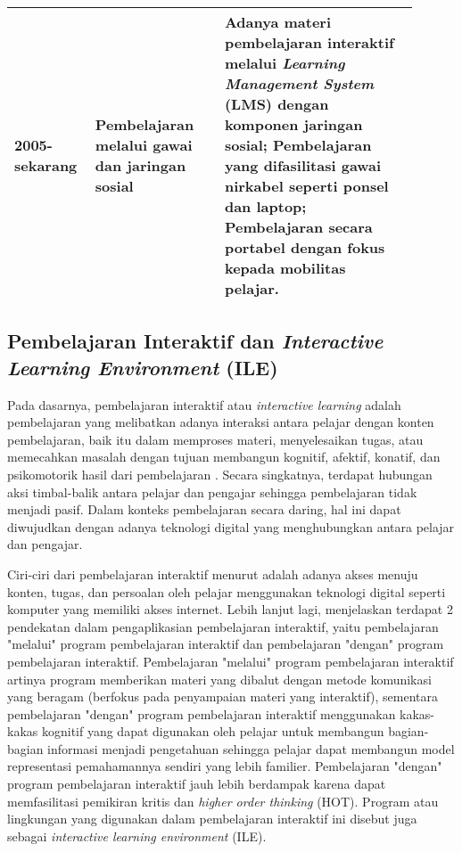 \begin{longtable}{ |p{0.15\linewidth}|p{0.3\linewidth}|p{0.45\linewidth}| }
  \hline
  2005- sekarang & Pembelajaran melalui gawai dan jaringan sosial                       & Adanya materi pembelajaran interaktif melalui \textit{Learning Management System} (LMS) dengan komponen jaringan sosial; Pembelajaran yang difasilitasi gawai nirkabel seperti ponsel dan laptop; Pembelajaran secara portabel dengan fokus kepada mobilitas pelajar. \\
  \hline
\end{longtable}

\subsection{Pembelajaran Interaktif dan \textit{Interactive Learning Environment} (ILE)}

Pada dasarnya, pembelajaran interaktif atau \textit{interactive learning} adalah pembelajaran yang melibatkan adanya interaksi antara pelajar dengan konten pembelajaran, baik itu dalam memproses materi, menyelesaikan tugas, atau memecahkan masalah dengan tujuan membangun kognitif, afektif, konatif, dan psikomotorik hasil dari pembelajaran \parencite{reeves2012interactive}. Secara singkatnya, terdapat hubungan aksi timbal-balik antara pelajar dan pengajar sehingga pembelajaran tidak menjadi pasif. Dalam konteks pembelajaran secara daring, hal ini dapat diwujudkan dengan adanya teknologi digital yang menghubungkan antara pelajar dan pengajar.

Ciri-ciri dari pembelajaran interaktif menurut \textcite{reeves2012interactive} adalah adanya akses menuju konten, tugas, dan persoalan oleh pelajar menggunakan teknologi digital seperti komputer yang memiliki akses internet. Lebih lanjut lagi, \textcite{reeves2012interactive} menjelaskan terdapat 2 pendekatan dalam pengaplikasian pembelajaran interaktif, yaitu pembelajaran "melalui" program pembelajaran interaktif dan pembelajaran "dengan" program pembelajaran interaktif. Pembelajaran "melalui" program pembelajaran interaktif artinya program memberikan materi yang dibalut dengan metode komunikasi yang beragam (berfokus pada penyampaian materi yang interaktif), sementara pembelajaran "dengan" program pembelajaran interaktif menggunakan kakas-kakas kognitif yang dapat digunakan oleh pelajar untuk membangun bagian-bagian informasi menjadi pengetahuan sehingga pelajar dapat membangun model representasi pemahamannya sendiri yang lebih familier. Pembelajaran "dengan" program pembelajaran interaktif jauh lebih berdampak karena dapat memfasilitasi pemikiran kritis dan \textit{higher order thinking} (HOT). Program atau lingkungan yang digunakan dalam pembelajaran interaktif ini disebut juga sebagai \textit{interactive learning environment} (ILE).

